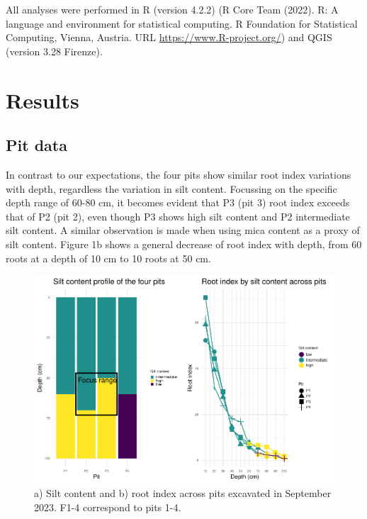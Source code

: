\documentclass[fleqn,12pt]{latex/stylish_article} %
\begin{document}
All analyses were performed in R (version 4.2.2) (R Core Team (2022). R: A language and environment for statistical computing. R Foundation for Statistical Computing, Vienna, Austria. URL \url{https://www.R-project.org/}) and QGIS (version 3.28 Firenze).

\hypertarget{results}{%
\section{Results}\label{results}}

\hypertarget{pit-data}{%
\subsection{Pit data}\label{pit-data}}

In contrast to our expectations, the four pits show similar root index variations with depth, regardless the variation in silt content. Focussing on the specific depth range of 60-80 cm, it becomes evident that P3 (pit 3) root index exceeds that of P2 (pit 2), even though P3 shows high silt content and P2 intermediate silt content. A similar observation is made when using mica content as a proxy of silt content. Figure 1b shows a general decrease of root index with depth, from 60 roots at a depth of 10 cm to 10 roots at 50 cm.



\scriptsize

\begin{figure}

{\centering \includegraphics[width=0.8\linewidth,]{pedoP16-report_files/figure-latex/pit-1} 

}

\caption{a) Silt content and b) root index across pits excavated in September 2023. F1-4 correspond to pits 1-4.}\label{fig:pit}
\end{figure}
\end{document}
